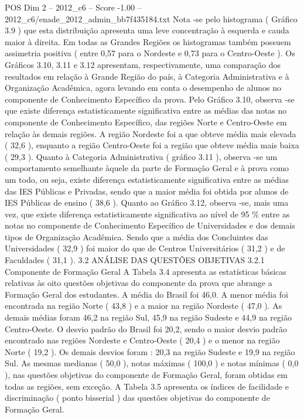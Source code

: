 \begin{textsample}{POS Dim 2 – 2012\_c6 – Score -1.00 – 2012\_c6/enade\_2012\_admin\_bb7f435184.txt}
Nota -se pelo histograma ( Gráfico 3.9 ) que esta distribuição apresenta uma leve concentração à esquerda e cauda maior à direita.
Em todas as Grandes Regiões os histogramas também possuem assimetria positiva ( entre 0,57 para o Nordeste e 0,73 para o Centro-Oeste ).
Os Gráficos 3.10, 3.11 e 3.12 apresentam, respectivamente, uma comparação dos resultados em relação à Grande Região do país, à Categoria Administrativa e à Organização Acadêmica, agora levando em conta o desempenho de alunos no componente de Conhecimento Específico da prova.
Pelo Gráfico 3.10, observa -se que existe diferença estatisticamente significativa entre as médias das notas no componente de Conhecimento Específico, das regiões Norte e Centro-Oeste em relação às demais regiões.
A região Nordeste foi a que obteve média mais elevada ( 32,6 ), enquanto a região Centro-Oeste foi a região que obteve média mais baixa ( 29,3 ).
Quanto à Categoria Administrativa ( gráfico 3.11 ), observa -se um comportamento semelhante àquele da parte de Formação Geral e à prova como um todo, ou seja, existe diferença estatisticamente significativa entre as médias das IES Públicas e Privadas, sendo que a maior média foi obtida por alunos de IES Públicas de ensino ( 38,6 ).
Quanto ao Gráfico 3.12, observa -se, mais uma vez, que existe diferença estatisticamente significativa ao nível de 95 \% entre as notas no componente de Conhecimento Específico de Universidades e dos demais tipos de Organização Acadêmica.
Sendo que a média dos Concluintes das Universidades ( 32,9 ) foi maior do que de Centros Universitários ( 31,2 ) e de Faculdades ( 31,1 ). 3.2 ANÁLISE DAS QUESTÕES OBJETIVAS 3.2.1 Componente de Formação Geral A Tabela 3.4 apresenta as estatísticas básicas relativas às oito questões objetivas do componente da prova que abrange a Formação Geral dos estudantes.
A média do Brasil foi 46,0.
A menor média foi encontrada na região Norte ( 43,8 ) e a maior na região Nordeste ( 47,0 ).
As demais médias foram 46,2 na região Sul, 45,9 na região Sudeste e 44,9 na região Centro-Oeste.
O desvio padrão do Brasil foi 20,2, sendo o maior desvio padrão encontrado nas regiões Nordeste e Centro-Oeste ( 20,4 ) e o menor na região Norte ( 19,2 ).
Os demais desvios foram : 20,3 na região Sudeste e 19,9 na região Sul.
As mesmas medianas ( 50,0 ), notas máximas ( 100,0 ) e notas mínimas ( 0,0 ), nas questões objetivas do componente de Formação Geral, foram obtidas em todas as regiões, sem exceção.
A Tabela 3.5 apresenta os índices de facilidade e discriminação ( ponto bisserial ) das questões objetivas do componente de Formação Geral.

\end{textsample}
